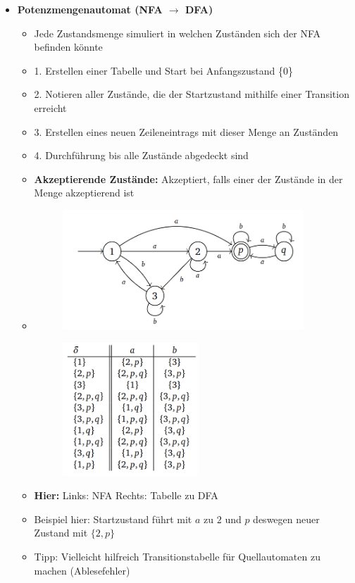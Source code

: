 \documentclass[11pt,a4paper]{article}
\begin{document}
\begin{itemize}
		
\item {\large \textbf{Potenzmengenautomat (NFA $\rightarrow$ DFA)}}
	\begin{itemize}
	\item Jede Zustandsmenge simuliert in welchen Zuständen sich der NFA befinden könnte
	\item 1. Erstellen einer Tabelle und Start bei Anfangszustand \{0\}
	\item 2. Notieren aller Zustände, die der Startzustand mithilfe einer Transition erreicht
	\item 3. Erstellen eines neuen Zeileneintrags mit dieser Menge an Zuständen
	\item 4. Durchführung bis alle Zustände abgedeckt sind
	\item \textbf{Akzeptierende Zustände:} Akzeptiert, falls einer der Zustände in der Menge akzeptierend ist
	\item[]
		\begin{minipage}{0.55\textwidth}
				\begin{figure}[H]
				\includegraphics[height=4.5cm]{Bilder/potenz1}
				\end{figure}
			\end{minipage}
			\begin{minipage}[t]{0.35\textwidth}
				\vspace{-2.25cm}
				\begin{figure}[H]
				\includegraphics[height=5cm]{Bilder/potenz2}
				\end{figure}
			\end{minipage}
	\item \textbf{Hier:} Links: NFA    Rechts: Tabelle zu DFA
	\item Beispiel hier: Startzustand führt mit $a$ zu $2$ und $p$ deswegen neuer Zustand mit $\{2,p\}$	
	\item Tipp: Vielleicht hilfreich Transitionstabelle für Quellautomaten zu machen (Ablesefehler)
	

\end{itemize}
\end{itemize}
\end{document}
